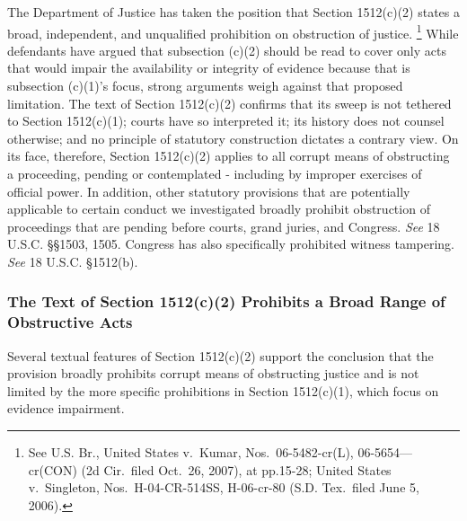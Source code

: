 The Department of Justice has taken the position that Section 1512(c)(2) states a broad, independent, and unqualified prohibition on obstruction of justice.%
\footnote{See U.S. Br., United States v.\ Kumar, Nos.~06-5482-cr(L), 06-5654—cr(CON) (2d Cir.\ filed Oct.~26, 2007), at pp.15-28; United States v.\ Singleton, Nos.~H-04-CR-514SS, H-06-cr-80 (S.D. Tex.\ filed June 5, 2006).}
While defendants have argued that subsection (c)(2) should be read to cover only acts that would impair the availability or integrity of evidence because that is subsection (c)(1)’s focus, strong arguments weigh against that proposed limitation.
The text of Section 1512(c)(2) confirms that its sweep is not tethered to Section 1512(c)(1); courts have so interpreted it; its history does not counsel otherwise; and no principle of statutory construction dictates a contrary view.
On its face, therefore, Section 1512(c)(2) applies to all corrupt means of obstructing a proceeding, pending or contemplated - including by improper exercises of official power.
In addition, other statutory provisions that are potentially applicable to certain conduct we investigated broadly prohibit obstruction of proceedings that are pending before courts, grand juries, and Congress.
\textit{See} 18 U.S.C. \S\S 1503, 1505.
Congress has also specifically prohibited witness tampering.
\textit{See} 18 U.S.C. \S 1512(b).

\subsubsection{The Text of Section 1512(c)(2) Prohibits a Broad Range of Obstructive Acts}

Several textual features of Section 1512(c)(2) support the conclusion that the provision broadly prohibits corrupt means of obstructing justice and is not limited by the more specific prohibitions in Section 1512(c)(1), which focus on evidence impairment.

